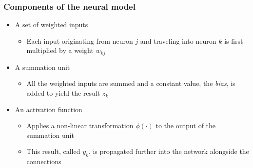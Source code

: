\begin{frame}
  \frametitle{Components of the neural model}
  \begin{itemize}
   \item A set of weighted inputs
     \begin{itemize}
       \item Each input originating from neuron \(j\) and traveling
         into neuron \(k\) is first multiplied by a weight \(w_{kj}\)
     \end{itemize}
   \item A summation unit
     \begin{itemize}
       \item All the weighted inputs are summed and a constant value,
         the \textit{bias}, is added to yield the result \(z_k\)
     \end{itemize}
   \item An activation function
     \begin{itemize}
       \item Applies a non-linear transformation \(\phi(\cdot)\) to
         the output of the summation unit
       \item This result, called \(y_k\), is propagated further into
         the network alongside the connections
     \end{itemize}
  \end{itemize}
\end{frame}
